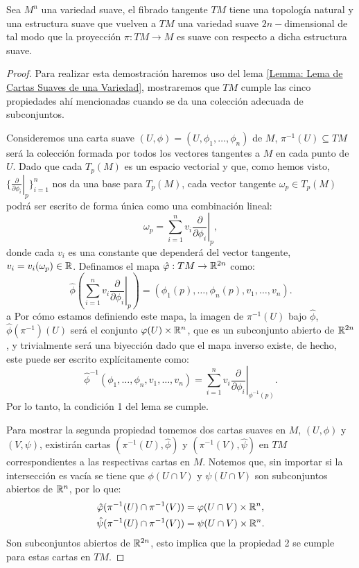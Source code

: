 \begin{theorem}\label{Teorema: Estructura de Variedad del Fibrado Tangente}
	Sea $M^n$ una variedad suave, el fibrado tangente $TM$ tiene una topología natural y una estructura suave que vuelven a $TM$ una variedad suave $2n-$dimensional de tal modo que la proyección $\pi: TM \to M$ es suave con respecto a dicha estructura suave.
\end{theorem}

\begin{proof}
	Para realizar esta demostración haremos uso del lema \ref{Lemma: Lema de Cartas Suaves de una Variedad}, mostraremos que $TM$ cumple las cinco propiedades ahí mencionadas cuando se da una colección adecuada de subconjuntos.

	Consideremos una carta suave $(U,\phi)=(U,\phi_1,\dots,\phi_n)$ de $M$, $\pi^{-1}(U) \subseteq TM$ será la colección formada por todos los vectores tangentes a $M$ en cada punto de $U$. Dado que cada $T_p(M)$ es un espacio vectorial y que, como hemos visto, $\{\left. \frac{\partial}{\partial \phi_{i}} \right|_{p}\}_{i=1}^{n}$ nos da una base para $T_p(M)$, cada vector tangente $\omega_p \in T_p(M)$ podrá ser escrito de forma única como una combinación lineal:
	\[
		\omega_p = \sum_{i=1}^{n} v_i \left. \frac{\partial}{\partial \phi_{i}}\right|_{p},
	\]
	donde cada $v_i$ es una constante que dependerá del vector tangente, $v_i = v_i(\omega_p) \in \mathbb{R}$. Definamos el mapa $\hat{\varphi}: TM \to \mathbb{R}^{2n}$ como:
	\[
		\hat{\phi} \left(\sum_{i=1}^{n} v_i
		\left. \frac{\partial}{\partial \phi_{i}}\right|_{p} \right)
		=
		\left(\phi_1(p), \dots, \phi_n(p), v_1, \dots, v_n \right).
	\]
a
	Por cómo estamos definiendo este mapa, la imagen de $\pi^{-1}(U)$ bajo $\hat{\phi}$, $\hat{\phi}(\pi^{-1})(U)$ será el conjunto $\varphi(U) \times \mathbb{R}^n$, que es un subconjunto abierto de $\mathbb{R}^{2n}$, y trivialmente será una biyección dado que el mapa inverso existe, de hecho, este puede ser escrito explícitamente como:
	\[
		\hat{\phi}^{-1}(\phi_{1},\dots, \phi_{n}, v_1, \dots, v_n)
		=
		\sum_{i=1}^{n} v_i \left. \frac{\partial}{\partial \phi_i} \right|_{\phi^{-1}(p)}.
	\]
	Por lo tanto, la condición 1 del lema se cumple.

	Para mostrar la segunda propiedad tomemos dos cartas suaves en $M$, $(U,\phi)$ y $(V,\psi)$, existirán cartas $(\pi^{-1}(U),\hat{\phi})$ y $(\pi^{-1}(V),\hat{\psi})$ en $TM$ correspondientes a las respectivas cartas en $M$. Notemos que, sin importar si la intersección es vacía se tiene que $\phi(U \cap V)$ y $\psi(U \cap V)$ son subconjuntos abiertos de $\mathbb{R}^n$, por lo que:
	\begin{align*}
		\hat{\varphi}(\pi^{-1}(U) \cap \pi^{-1}(V)) & =
		\varphi(U \cap V) \times \mathbb{R}^n,                  \\
		\hat{\psi}(\pi^{-1}(U) \cap \pi^{-1}(V)) & =
		\psi(U \cap V) \times \mathbb{R}^n.                  \\
	\end{align*}
	Son subconjuntos abiertos de $\mathbb{R}^{2n}$, esto implica que la propiedad 2 se cumple para estas cartas en $TM$.


\end{proof}
